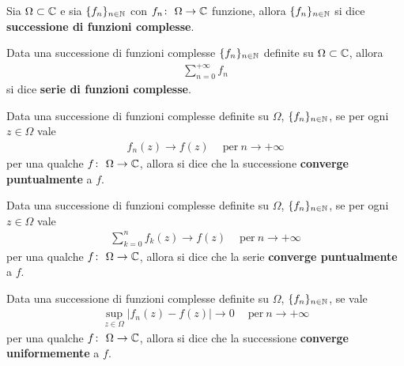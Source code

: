 \begin{definition}
	\label{defn:successione-di-funzioni-complesse}
	Sia $\Omega \subset \mathbb{C}$ e sia $\{f_n\}_{n\in\mathbb{N}}$ con $f_n \colon\ \Omega \rightarrow \mathbb{C}$ funzione, allora $\{f_n\}_{n\in\mathbb{N}}$ si dice \textbf{successione di funzioni complesse}.
\end{definition}

\begin{definition}
	\label{defn:serie-di-funzioni-complesse}
	Data una successione di funzioni complesse $\{f_n\}_{n\in\mathbb{N}}$ definite su $\Omega\subset\mathbb{C}$, allora 
	\begin{equation*}
	\begin{aligned}
		\sum_{n=0}^{+\infty} f_n 
	\end{aligned}
	\end{equation*}
	si dice \textbf{serie di funzioni complesse}.
\end{definition}

\begin{definition}
	\label{defn:convergenza-puntuale-successione}
	Data una successione di funzioni complesse definite su $\Omega$, $\{f_n\}_{n\in\mathbb{N}}$, se per ogni $z \in \Omega$ vale 
	\begin{equation*}
	\begin{aligned}
		f_n(z) \to f(z) \quad\ \text{per}\ n \to +\infty
	\end{aligned}
	\end{equation*}
	per una qualche $f \colon\ \Omega \rightarrow \mathbb{C}$, allora si dice che la successione \textbf{converge puntualmente} a $f$.
\end{definition}

\begin{definition}
	\label{defn:convergenza-puntuale-serie}
	Data una successione di funzioni complesse definite su $\Omega$, $\{f_n\}_{n\in\mathbb{N}}$, se per ogni $z \in \Omega$ vale 
	\begin{equation*}
	\begin{aligned}
		\sum^{n}_{k=0} f_k(z) \to f(z) \quad\ \text{per}\ n \to +\infty
	\end{aligned}
	\end{equation*}
	per una qualche $f \colon\ \Omega \rightarrow \mathbb{C}$, allora si dice che la serie \textbf{converge puntualmente} a $f$.
\end{definition}

\begin{definition}
	\label{defn:convergenza-uniforme-successione}
	Data una successione di funzioni complesse definite su $\Omega$, $\{f_n\}_{n\in\mathbb{N}}$, se vale 
	\begin{equation*}
	\begin{aligned}
		\sup_{z \in \Omega} |f_n(z) - f(z)| \to 0 \quad\ \text{per}\ n \to +\infty
	\end{aligned}
	\end{equation*}
	per una qualche $f \colon\ \Omega \rightarrow \mathbb{C}$, allora si dice che la successione \textbf{converge uniformemente} a $f$.
\end{definition}

